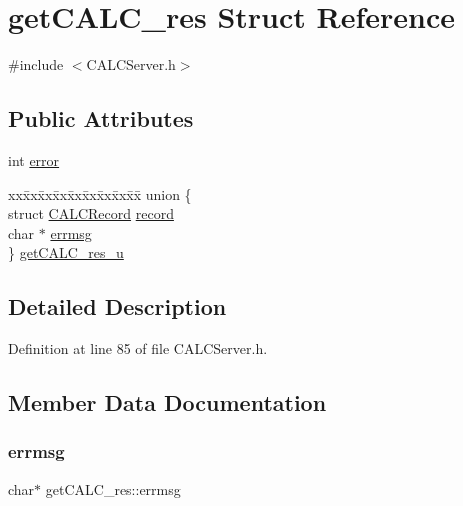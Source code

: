 \hypertarget{structget_c_a_l_c__res}{}\section{get\+C\+A\+L\+C\+\_\+res Struct Reference}
\label{structget_c_a_l_c__res}


{\ttfamily \#include $<$C\+A\+L\+C\+Server.\+h$>$}

\subsection*{Public Attributes}
\begin{DoxyCompactItemize}
\item 
int \hyperlink{structget_c_a_l_c__res_a7b710098a54c5364b16c8ae938c3d259}{error}
\item 
\begin{tabbing}
xx\=xx\=xx\=xx\=xx\=xx\=xx\=xx\=xx\=\kill
union \{\\
\>struct \hyperlink{struct_c_a_l_c_record}{CALCRecord} \hyperlink{structget_c_a_l_c__res_ab3fca75ff56c38ead38c929200c05532}{record}\\
\>char $\ast$ \hyperlink{structget_c_a_l_c__res_a394d9cf9a31d329bc79b8fa261f5cae2}{errmsg}\\
\} \hyperlink{structget_c_a_l_c__res_a80f6113d079b86a7a8053508da4de62d}{getCALC\_res\_u}\\

\end{tabbing}\end{DoxyCompactItemize}


\subsection{Detailed Description}


Definition at line 85 of file C\+A\+L\+C\+Server.\+h.



\subsection{Member Data Documentation}
\mbox{\label{structget_c_a_l_c__res_a394d9cf9a31d329bc79b8fa261f5cae2}} 
\subsubsection{\texorpdfstring{errmsg}{errmsg}}
{\footnotesize\ttfamily char$\ast$ get\+C\+A\+L\+C\+\_\+res\+::errmsg}




